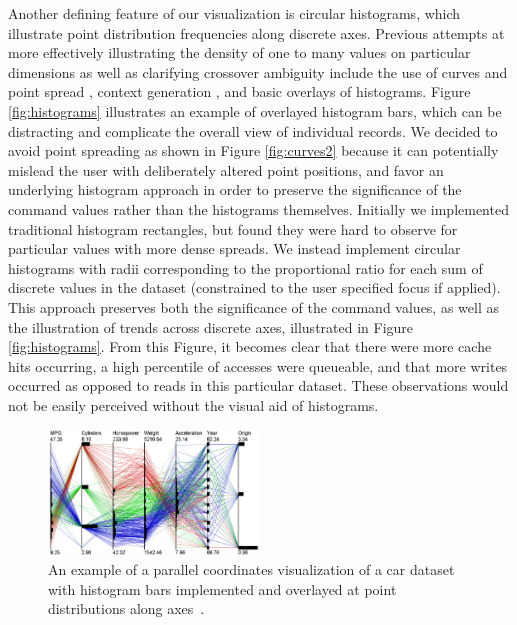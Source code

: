 \documentclass[journal]{vgtc}                %
\begin{document}
Another defining feature of our visualization is circular histograms, which illustrate point distribution frequencies along discrete axes. Previous attempts at more effectively illustrating the density of one to many values on particular dimensions as well as clarifying crossover ambiguity include the use of curves and point spread \cite{Graham:2003:UCE}, context generation \cite{novotny:2006:OPFC}, and basic overlays of histograms. Figure \ref{fig:histograms} illustrates an example of overlayed histogram bars, which can be distracting and complicate the overall view of individual records. We decided to avoid point spreading as shown in Figure \ref{fig:curves2} because it can potentially mislead the user with deliberately altered point positions, and favor an underlying histogram approach in order to preserve the significance of the command values rather than the histograms themselves. Initially we implemented traditional histogram rectangles, but found they were hard to observe for particular values with more dense spreads. We instead implement circular histograms with radii corresponding to the proportional ratio for each sum of discrete values in the dataset (constrained to the user specified focus if applied). This approach preserves both the significance of the command values, as well as the illustration of trends across discrete axes, illustrated in Figure \ref{fig:histograms}. From this Figure, it becomes clear that there were more cache hits occurring, a high percentile of accesses were queueable, and that more writes occurred as opposed to reads in this particular dataset. These observations would not be easily perceived without the visual aid of histograms.

\begin{figure}[h!]
 \centering
 \includegraphics[width=0.5\textwidth]{images/histograms.eps}
 \caption[Parallel coordinates visualization with histogram bars overlayed.]{An example of a parallel coordinates visualization of a car dataset with histogram bars implemented and overlayed at point distributions along axes~\cite{McDonnell_Mueller_2008}.}
 \label{fig:histograms_ex}
\end{figure}
\end{document}
